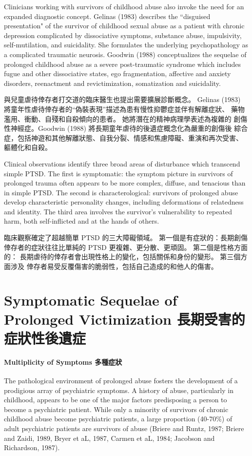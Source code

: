 \documentclass[12pt]{article}
\begin{document}
    Clinicians working with survivors of childhood abuse also invoke the need
    for an expanded diagnostic concept. Gelinas (1983) describes the
    ``disguised presentation" of the survivor of childhood sexual abuse as a
    patient with chronic depression complicated by dissociative symptoms,
    substance abuse, impulsivity, self-mutilation, and suicidality. She
    formulates the underlying psychopathology as a complicated traumatic
    neurosis. Goodwin (1988) conceptualizes the sequelae of prolonged childhood
    abuse as a severe post-traumatic syndrome which includes fugue and other
    dissociative states, ego fragmentation, affective and anxiety disorders,
    reenactment and revictimization, somatization and suicidality.

    與兒童虐待倖存者打交道的臨床醫生也提出需要擴展診斷概念。 Gelinas (1983)
    將童年性虐待倖存者的“偽裝表現”描述為患有慢性抑鬱症並伴有解離症狀、
    藥物濫用、衝動、自殘和自殺傾向的患者。 她將潛在的精神病理學表述為複雜的
    創傷性神經症。Goodwin (1988) 將長期童年虐待的後遺症概念化為嚴重的創傷後
    綜合症，包括神遊和其他解離狀態、自我分裂、情感和焦慮障礙、重演和再次受害、
    軀體化和自殺。

    Clinical observations identify three broad areas of disturbance which
    transcend simple PTSD. The first is symptomatic: the symptom picture in
    survivors of prolonged trauma often appears to be more complex, diffuse,
    and tenacious than in simple PTSD. The second is characterological:
    survivors of prolonged abuse develop characteristic personality changes,
    including deformations of relatedness and identity. The third area involves
    the survivor's vulnerability to repeated harm, both self-inflicted and at
    the hands of others.

    臨床觀察確定了超越簡單 PTSD 的三大障礙領域。 第一個是有症狀的：長期創傷
    倖存者的症狀往往比單純的 PTSD 更複雜、更分散、更頑固。 第二個是性格方面的：
    長期虐待的倖存者會出現性格上的變化，包括關係和身份的變形。 第三個方面涉及
    倖存者易受反覆傷害的脆弱性，包括自己造成的和他人的傷害。

\section{Symptomatic Sequelae of Prolonged Victimization
長期受害的症狀性後遺症}

\paragraph{Multiplicity of Symptoms 多種症狀}
    The pathological environment of prolonged abuse fosters the development of
    a prodigious array of psychiatric symptoms. A history of abuse,
    particularly in childhood, appears to be one of the major factors
    predisposing a person to become a psychiatric patient. While only a
    minority of survivors of chronic childhood abuse become psychiatric
    patients, a large proportion (40-70\%) of adult psychiatric patients are
    survivors of abuse (Briere and Runtz, 1987; Briere and Zaidi, 1989, Bryer
    et aL, 1987, Carmen et aL, 1984; Jacobson and Richardson, 1987).
\end{document}
